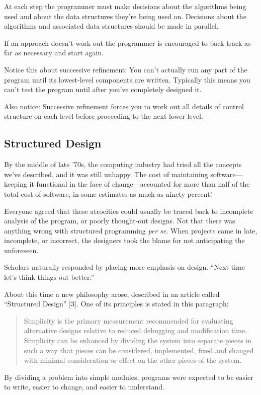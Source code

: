 At each step the programmer must make decisions about the algorithms
being used and about the data structures they're being used on. Decisions
about the algorithms and associated data structures should be made
in parallel.

If an approach doesn't work out the programmer is encouraged to back
track as far as necessary and start again.

Notice this about successive refinement: You can't actually run any
part of the program until its lowest-level components are written.
Typically this means you can't test the program until after you've
completely designed it. 

Also notice: Successive refinement forces you to work out all details
of control structure on each level before proceeding to the next lower
level.


\subsection{Structured Design}

By the middle of late '70s, the computing industry had tried all the
concepts we've described, and it was still unhappy. The cost of maintaining
software---keeping it functional in the face of change---accounted
for more than half of the total cost of software, in some estimates
as much as ninety percent! 


Everyone agreed that these atrocities could usually be traced back
to incomplete analysis of the program, or poorly thought-out designs.
Not that there was anything wrong with structured programming \emph{per
se}. When projects came in late, incomplete, or incorrect, the designers
took the blame for not anticipating the unforeseen. 

Scholars naturally responded by placing more emphasis on design. {}``Next
time let's think things out better.''

About this time a new philosophy arose, described in an article called
``Structured Design'' {[}3{]}. One of its principles is stated in
this paragraph: 

\begin{quote}
Simplicity is the primary measurement recommended for evaluating alternative
designs relative to reduced debugging and modification time. Simplicity
can be enhanced by dividing the system into separate pieces in such
a way that pieces can be considered, implemented, fixed and changed
with minimal consideration or effect on the other pieces of the system.
\end{quote}
By dividing a problem into simple modules, programs were expected
to be easier to write, easier to change, and easier to understand.

